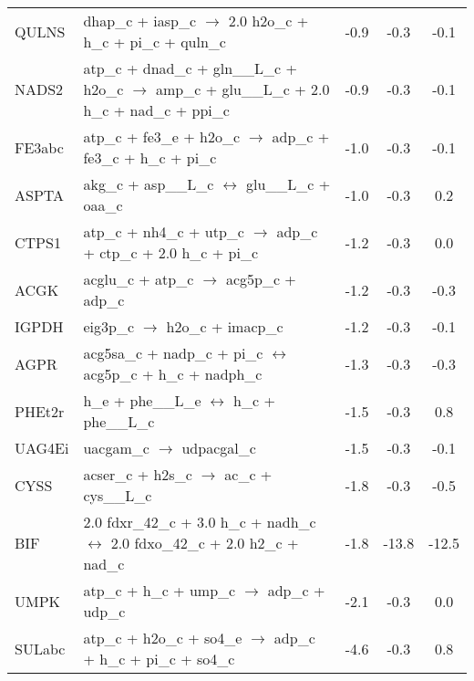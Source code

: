 \begin{longtable}{lp{}ccc}
QULNS	&	dhap\_c + iasp\_c $\rightarrow$ 2.0 h2o\_c + h\_c + pi\_c + quln\_c	&	-0.9	&	-0.3	&	-0.1	\\
NADS2	&	atp\_c + dnad\_c + gln\_\_L\_c + h2o\_c $\rightarrow$ amp\_c + glu\_\_L\_c + 2.0 h\_c + nad\_c + ppi\_c	&	-0.9	&	-0.3	&	-0.1	\\
FE3abc	&	atp\_c + fe3\_e + h2o\_c $\rightarrow$ adp\_c + fe3\_c + h\_c + pi\_c	&	-1.0	&	-0.3	&	-0.1	\\
ASPTA	&	akg\_c + asp\_\_L\_c $\leftrightarrow$ glu\_\_L\_c + oaa\_c	&	-1.0	&	-0.3	&	0.2	\\
CTPS1	&	atp\_c + nh4\_c + utp\_c $\rightarrow$ adp\_c + ctp\_c + 2.0 h\_c + pi\_c	&	-1.2	&	-0.3	&	0.0	\\
ACGK	&	acglu\_c + atp\_c $\rightarrow$ acg5p\_c + adp\_c	&	-1.2	&	-0.3	&	-0.3	\\
IGPDH	&	eig3p\_c $\rightarrow$ h2o\_c + imacp\_c	&	-1.2	&	-0.3	&	-0.1	\\
AGPR	&	acg5sa\_c + nadp\_c + pi\_c $\leftrightarrow$ acg5p\_c + h\_c + nadph\_c	&	-1.3	&	-0.3	&	-0.3	\\
PHEt2r	&	h\_e + phe\_\_L\_e $\leftrightarrow$ h\_c + phe\_\_L\_c	&	-1.5	&	-0.3	&	0.8	\\
UAG4Ei	&	uacgam\_c $\rightarrow$ udpacgal\_c	&	-1.5	&	-0.3	&	-0.1	\\
CYSS	&	acser\_c + h2s\_c $\rightarrow$ ac\_c + cys\_\_L\_c	&	-1.8	&	-0.3	&	-0.5	\\
BIF	&	2.0 fdxr\_42\_c + 3.0 h\_c + nadh\_c $\leftrightarrow$ 2.0 fdxo\_42\_c + 2.0 h2\_c + nad\_c	&	-1.8	&	-13.8	&	-12.5	\\
UMPK	&	atp\_c + h\_c + ump\_c $\rightarrow$ adp\_c + udp\_c	&	-2.1	&	-0.3	&	0.0	\\
SULabc	&	atp\_c + h2o\_c + so4\_e $\rightarrow$ adp\_c + h\_c + pi\_c + so4\_c	&	-4.6	&	-0.3	&	0.8	\\
\end{longtable}
\normalsize

